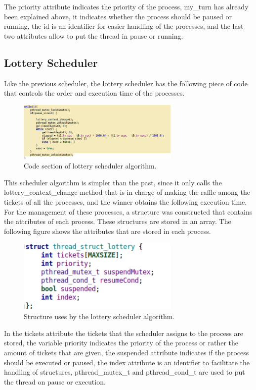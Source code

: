 \documentclass{article}
\begin{document}
The priority attribute indicates the priority of the process, my\_turn has already been explained above, it indicates whether the process should be paused or running, the id is an identifier for easier handling of the processes, and the last two attributes allow to put the thread in pause or running.

\subsection{Lottery Scheduler}
Like the previous scheduler, the lottery scheduler has the following piece of code that controls the order and execution time of the processes.
\begin{figure}[H]
	\centering
	\captionsetup{justification=centering, margin=1cm}
    \includegraphics[width = 0.7\textwidth]{lottery.png}
    \caption{Code section of lottery scheduler algorithm.}
	\label{fig:lottery}
\end{figure}
This scheduler algorithm is simpler than the past, since it only calls the lottery\_context\_change method that is in charge of making the raffle among the tickets of all the processes, and the winner obtains the following execution time.\\
For the management of these processes, a structure was constructed that contains the attributes of each process. These structures are stored in an array. The following figure shows the attributes that are stored in each process.
\begin{figure}[H]
	\centering
	\captionsetup{justification=centering, margin=1cm}
    \includegraphics[width = 0.7\textwidth]{structLottery.png}
    \caption{Structure uses by the lottery scheduler algorithm.}
	\label{fig:structLottery}
\end{figure}
In the tickets attribute the tickets that the scheduler assigns to the process are stored, the variable priority indicates the priority of the process or rather the amount of tickets that are given, the suspended attribute indicates if the process should be executed or paused, the index attribute is an identifier to facilitate the handling of structures, pthread\_mutex\_t and pthread\_cond\_t are used to put the thread on pause or execution. 
\end{document}

